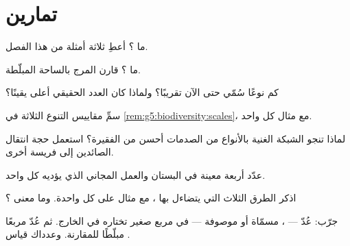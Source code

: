 \section{تمارين}

\begin{exercise}[$\star$]\label{exo:g5:biodiversity:1}
ما ؟ أعطِ ثلاثة أمثلة من هذا الفصل.
\end{exercise}

\begin{exercise}[$\star$]\label{exo:g5:biodiversity:2}
ما ؟ قارن المرج بالساحة المبلّطة.
\end{exercise}

\begin{exercise}[$\star$]\label{exo:g5:biodiversity:3}
كم نوعًا سُمّي حتى الآن تقريبًا؟ ولماذا كان العدد الحقيقي أعلى
يقينًا؟
\end{exercise}

\begin{exercise}[$\star$]\label{exo:g5:biodiversity:4}
سمِّ مقاييس التنوع الثلاثة في \cref{rem:g5:biodiversity:scales}،
مع مثال كل واحد.
\end{exercise}

\begin{exercise}[$\star$]\label{exo:g5:biodiversity:5}
لماذا تنجو الشبكة الغنية بالأنواع من الصدمات أحسن من الفقيرة؟
استعمل حجة انتقال الصائدين إلى فريسة أخرى.
\end{exercise}

\begin{exercise}[$\star$]\label{exo:g5:biodiversity:6}
عدّد أربعة  معينة في البستان والعمل المجاني الذي يؤديه كل
واحد.
\end{exercise}

\begin{exercise}[$\star$]\label{exo:g5:biodiversity:7}
اذكر الطرق الثلاث التي يتضاءل بها ، مع مثال على كل واحدة. وما
معنى \emph{}؟
\end{exercise}

\begin{exercise}[$\star$]\label{exo:g5:biodiversity:8}
جرّب: عُدّ  ---  ، مسمّاة أو موصوفة --- في
مربع صغير تختاره في الخارج. ثم عُدّ مربعًا مبلّطًا للمقارنة.
وعدداك قياس .
\end{exercise}

